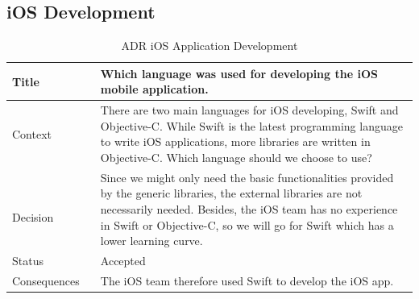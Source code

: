 \documentclass[12pt,a4paper]{article}
\begin{document}
\begin{appendices}
          \subsection{iOS Development}
            \begin{table}[H]
              \centering
                \begin{tabularx}{\textwidth}{l X}
                  \hline
                  Title & Which language was used for developing the iOS mobile application. \\ \hline
                  Context & There are two main languages for iOS developing, Swift and Objective-C. While Swift is the latest programming language to write iOS applications, more libraries are written in Objective-C. Which language should we choose to use?\\ 
                  Decision & Since we might only need the basic functionalities provided by the generic libraries, the external libraries are not necessarily needed. Besides, the iOS team has no experience in Swift or Objective-C, so we will go for Swift which has a lower learning curve. \\ 
                  Status & Accepted \\ 
                  Consequences & The iOS team therefore used Swift to develop the iOS app.  \\     
                  \hline
                \end{tabularx}
                \caption[Table caption text]{ADR iOS Application Development}
                \label{table:ADR iOS Application Development}
            \end{table}


\end{appendices}
\end{document}
